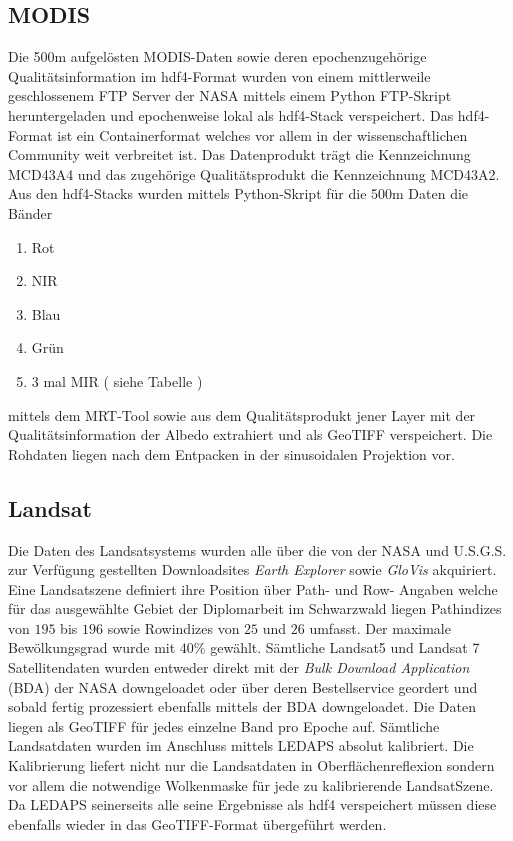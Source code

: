 \documentclass[11pt]{report}
\begin{document}
\subsection{MODIS}
Die 500m aufgelösten MODIS-Daten sowie deren epochenzugehörige Qualitätsinformation im hdf4-Format wurden von einem mittlerweile geschlossenem FTP Server der NASA mittels einem Python FTP-Skript heruntergeladen und epochenweise lokal als hdf4-Stack verspeichert. Das hdf4-Format ist ein Containerformat welches vor allem in der wissenschaftlichen Community weit verbreitet ist. Das Datenprodukt trägt die Kennzeichnung MCD43A4 und das zugehörige Qualitätsprodukt die Kennzeichnung MCD43A2. Aus den hdf4-Stacks wurden  mittels Python-Skript für die 500m Daten die Bänder \begin{enumerate} \item Rot \item NIR \item Blau \item Grün \item 3 mal MIR ( siehe Tabelle ) \end{enumerate} mittels dem MRT-Tool sowie aus dem Qualitätsprodukt jener Layer mit der Qualitätsinformation der Albedo extrahiert und als GeoTIFF verspeichert. Die Rohdaten liegen nach dem Entpacken in der sinusoidalen Projektion vor.

\subsection{Landsat}
Die Daten des Landsatsystems wurden alle über die von der NASA und U.S.G.S. zur Verfügung gestellten Downloadsites \textit{Earth Explorer} sowie \textit{GloVis} akquiriert. Eine Landsatszene definiert ihre Position über Path- und Row- Angaben welche für das ausgewählte Gebiet der Diplomarbeit im Schwarzwald liegen Pathindizes von $195$ bis $196$ sowie Rowindizes von $25$ und $26$ umfasst. Der maximale Bewölkungsgrad wurde mit $40\%$ gewählt. Sämtliche Landsat5 und Landsat 7 Satellitendaten wurden entweder direkt mit der \textit{Bulk Download Application} (BDA) der NASA downgeloadet oder über deren Bestellservice geordert und sobald fertig prozessiert ebenfalls mittels der BDA downgeloadet.
Die Daten liegen als GeoTIFF für jedes einzelne Band pro Epoche auf. Sämtliche Landsatdaten wurden im Anschluss mittels LEDAPS absolut kalibriert. Die Kalibrierung liefert nicht nur die Landsatdaten in Oberflächenreflexion sondern vor allem die notwendige Wolkenmaske für jede zu kalibrierende LandsatSzene. Da LEDAPS seinerseits alle seine Ergebnisse  als hdf4 verspeichert müssen diese ebenfalls wieder in das GeoTIFF-Format übergeführt werden. 
\end{document}
